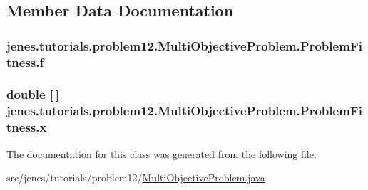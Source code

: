 \subsection{Member Data Documentation}
\hypertarget{classjenes_1_1tutorials_1_1problem12_1_1_multi_objective_problem_1_1_problem_fitness_ad8bff7799f57db81574946eb94ea9a90}{
\subsubsection[{f}]{ jenes.\-tutorials.\-problem12.\-Multi\-Objective\-Problem.\-Problem\-Fitness.\-f\hspace{0.3cm}{\ttfamily [private]}}}\label{classjenes_1_1tutorials_1_1problem12_1_1_multi_objective_problem_1_1_problem_fitness_ad8bff7799f57db81574946eb94ea9a90}
\hypertarget{classjenes_1_1tutorials_1_1problem12_1_1_multi_objective_problem_1_1_problem_fitness_ab11c6567564d48f09f3d3c660d1ad6fa}{
\subsubsection[{x}]{\setlength{\rightskip}{0pt plus 5cm}double \mbox{[}$\,$\mbox{]} jenes.\-tutorials.\-problem12.\-Multi\-Objective\-Problem.\-Problem\-Fitness.\-x\hspace{0.3cm}{\ttfamily [private]}}}\label{classjenes_1_1tutorials_1_1problem12_1_1_multi_objective_problem_1_1_problem_fitness_ab11c6567564d48f09f3d3c660d1ad6fa}


The documentation for this class was generated from the following file\-:\begin{DoxyCompactItemize}
\item 
src/jenes/tutorials/problem12/\hyperlink{problem12_2_multi_objective_problem_8java}{Multi\-Objective\-Problem.\-java}\end{DoxyCompactItemize}
